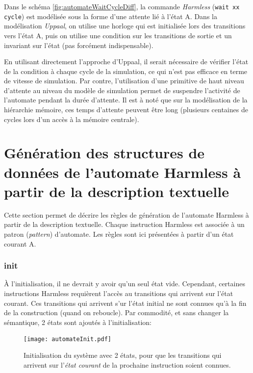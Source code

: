 \documentclass[11pt,a4paper]{article}
\begin{document}
Dans le schéma \ref{fig:automateWaitCycleDiff}, la commande \emph{Harmless} (\texttt{wait xx cycle}) est modélisée sous la forme d'une attente lié à l'état A. Dans la modélisation \emph{Uppaal}, on utilise une horloge qui est initialisée lors des transitions vers l'état A, puis on utilise une condition sur les transitions de sortie et un invariant sur l'état (pas forcément indispensable).

En utilisant directement l'approche d'Uppaal, il serait nécessaire de vérifier l'état de la condition à chaque cycle de la simulation, ce qui n'est pas efficace en terme de vitesse de simulation. Par contre, l'utilisation d'une primitive de haut niveau d'attente au niveau du modèle de simulation permet de suspendre l'activité de l'automate pendant la durée d'attente. Il est à noté que sur la modélisation de la hiérarchie mémoire, ces temps d'attente peuvent être long (plusieurs centaines de cycles lors d'un accès à la mémoire centrale).

\appendix
\section{Génération des structures de données de l'automate Harmless à partir de la description textuelle}
Cette section permet de décrire les règles de génération de l'automate Harmless à partir de la description textuelle. Chaque instruction Harmless est associée à un patron (\emph{pattern}) d'automate. Les règles sont ici présentées à partir d'un état courant A.

\subsubsection{init}
À l'initialisation, il ne devrait y avoir qu'un seul état vide. Cependant, certaines instructions Harmless requièrent l'accès au transitions qui arrivent sur l'état courant. Ces transitions qui arrivent s'ur l'état initial ne sont connues qu'à la fin de la construction (quand on reboucle). Par commodité, et sans changer la sémantique, 2 états sont ajoutés à l'initialisation:

\begin{figure}[htbp] %
   \centering
   \texttt{[image: automateInit.pdf]} 
   \caption{Initialisation du système avec 2 états, pour que les transitions qui arrivent sur l'\emph{état courant} de la prochaine instruction soient connues.}
   \label{fig:automateInit}
\end{figure}
\end{document}
